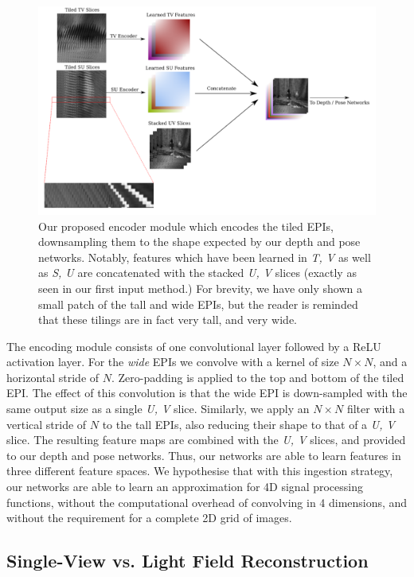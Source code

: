 \begin{figure}[H]
    \centering 
    \includegraphics[width=6in]{images/encoderpipewithinset.png}
    \caption[An encoder module for extracting features from EPIs]{Our proposed encoder module which encodes the tiled EPIs, downsampling them to the shape expected by our depth and pose networks. Notably, features which have been learned in \textit{T, V} as well as \textit{S, U} are concatenated with the stacked \textit{U, V} slices (exactly as seen in our first input method.) For brevity, we have only shown a small patch of the tall and wide EPIs, but the reader is reminded that these tilings are in fact very tall, and very wide.}
\end{figure}


The encoding module consists of one convolutional layer followed by a ReLU activation layer. For the \textit{wide} EPIs we convolve with a kernel of size $N \times N$, and a horizontal stride of $N$. Zero-padding is applied to the top and bottom of the tiled EPI. The effect of this convolution is that the wide EPI is down-sampled with the same output size as a single \textit{U, V} slice. Similarly, we apply an $N \times N$ filter with a vertical stride of $N$ to the tall EPIs, also reducing their shape to that of a \textit{U, V} slice. The resulting feature maps are combined with the \textit{U, V} slices, and provided to our depth and pose networks. Thus, our networks are able to learn features in three different feature spaces. We hypothesise that with this ingestion strategy, our networks are able to learn an approximation for 4D signal processing functions, without the computational overhead of convolving in 4 dimensions, and without the requirement for a complete 2D grid of images.


\subsection{Single-View vs. Light Field Reconstruction}


